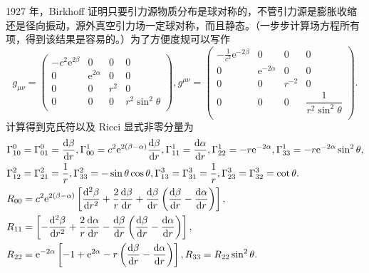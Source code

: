\documentclass[11pt, a4paper, oneside, onecolumn]{ctexart}
\numberwithin{equation}{subsection}
\begin{document}
1927 年，Birkhoff 证明只要引力源物质分布是球对称的，不管引力源是膨胀收缩还是径向振动，源外真空引力场一定球对称，而且静态。（一步步计算场方程所有项，得到该结果是容易的。）为了方便度规可以写作
\begin{equation}
g_{\mu\nu}=\begin{pmatrix}
-c^{2}\mathrm{e}^{2\beta} & 0 & 0 & 0\\
0 & \mathrm{e}^{2\alpha} & 0 & 0\\
0 & 0 & r^{2} & 0\\
0 & 0 & 0 & r^{2}\sin^{2}\theta\\
\end{pmatrix},
g^{\mu\nu}=\begin{pmatrix}
-\frac{1}{c^{2}}\mathrm{e}^{-2\beta} & 0 & 0 & 0\\
0 & \mathrm{e}^{-2\alpha} & 0 & 0\\
0 & 0 & r^{-2} & 0\\
0 & 0 & 0 & \dfrac{1}{r^{2}\sin^{2}\theta}\\
\end{pmatrix}.
\end{equation}
计算得到克氏符以及 Ricci 显式非零分量为
\begin{align}
&\Gamma_{10}^{0}=\Gamma_{01}^{0}=\frac{\mathrm{d}\beta}{\mathrm{d}r},\Gamma_{00}^{1}=c^{2}\mathrm{e}^{2\left(\beta-\alpha\right)}\frac{\mathrm{d}\beta}{\mathrm{d}r},\Gamma_{11}^{1}=\frac{\mathrm{d}\alpha}{\mathrm{d}r},\Gamma_{22}^{1}=-r\mathrm{e}^{-2\alpha},\Gamma_{33}^{1}=-r\mathrm{e}^{-2\alpha}\sin^{2}\theta,\notag\\
&\Gamma_{12}^{2}=\Gamma_{21}^{2}=\frac{1}{r},\Gamma_{33}^{2}=-\sin\theta\cos\theta,\Gamma_{13}^{3}=\Gamma_{31}^{3}=\frac{1}{r},\Gamma_{23}^{3}=\Gamma_{32}^{3}=\cot\theta.\notag\\
&R_{00}=c^{2}\mathrm{e}^{2\left(\beta-\alpha\right)}\left[\frac{\mathrm{d}^{2}\beta}{\mathrm{d}r^{2}}+\frac{2}{r}\frac{\mathrm{d}\beta}{\mathrm{d}r}+\frac{\mathrm{d}\beta}{\mathrm{d}r}\left(\frac{\mathrm{d}\beta}{\mathrm{d}r}-\frac{\mathrm{d}\alpha}{\mathrm{d}r}\right)\right],\notag\\
&R_{11}=\left[-\frac{\mathrm{d}^{2}\beta}{\mathrm{d}r^{2}}+\frac{2}{r}\frac{\mathrm{d}\alpha}{\mathrm{d}r}-\frac{\mathrm{d}\beta}{\mathrm{d}r}\left(\frac{\mathrm{d}\beta}{\mathrm{d}r}-\frac{\mathrm{d}\alpha}{\mathrm{d}r}\right)\right],\notag\\
&R_{22}=\mathrm{e}^{-2\alpha}\left[-1+\mathrm{e}^{2\alpha}-r\left(\frac{\mathrm{d}\beta}{\mathrm{d}r}-\frac{\mathrm{d}\alpha}{\mathrm{d}r}\right)\right],R_{33}=R_{22}\sin^{2}\theta.\notag
\end{align}
\end{document}
